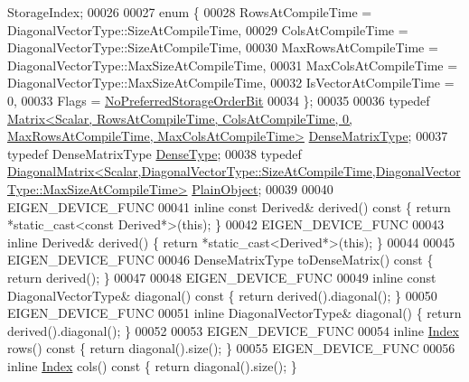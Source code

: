 \begin{DoxyCode}
      StorageIndex;
00026 
00027     \textcolor{keyword}{enum} \{
00028       RowsAtCompileTime = DiagonalVectorType::SizeAtCompileTime,
00029       ColsAtCompileTime = DiagonalVectorType::SizeAtCompileTime,
00030       MaxRowsAtCompileTime = DiagonalVectorType::MaxSizeAtCompileTime,
00031       MaxColsAtCompileTime = DiagonalVectorType::MaxSizeAtCompileTime,
00032       IsVectorAtCompileTime = 0,
00033       Flags = \hyperlink{group__flags_ga3c186ad80ddcf5e2ed3d7ee31cca1860}{NoPreferredStorageOrderBit}
00034     \};
00035 
00036     \textcolor{keyword}{typedef} 
      \hyperlink{group___core___module_class_eigen_1_1_matrix}{Matrix<Scalar, RowsAtCompileTime, ColsAtCompileTime, 0, MaxRowsAtCompileTime, MaxColsAtCompileTime>}
       \hyperlink{group___core___module_class_eigen_1_1_matrix}{DenseMatrixType};
00037     \textcolor{keyword}{typedef} DenseMatrixType \hyperlink{group___core___module_class_eigen_1_1_matrix}{DenseType};
00038     \textcolor{keyword}{typedef} 
      \hyperlink{group___core___module_class_eigen_1_1_diagonal_matrix}{DiagonalMatrix<Scalar,DiagonalVectorType::SizeAtCompileTime,DiagonalVectorType::MaxSizeAtCompileTime>}
       \hyperlink{group___core___module_class_eigen_1_1_diagonal_matrix}{PlainObject};
00039 
00040     EIGEN\_DEVICE\_FUNC
00041     \textcolor{keyword}{inline} \textcolor{keyword}{const} Derived& derived()\textcolor{keyword}{ const }\{ \textcolor{keywordflow}{return} *\textcolor{keyword}{static\_cast<}\textcolor{keyword}{const }Derived*\textcolor{keyword}{>}(\textcolor{keyword}{this}); \}
00042     EIGEN\_DEVICE\_FUNC
00043     \textcolor{keyword}{inline} Derived& derived() \{ \textcolor{keywordflow}{return} *\textcolor{keyword}{static\_cast<}Derived*\textcolor{keyword}{>}(\textcolor{keyword}{this}); \}
00044 
00045     EIGEN\_DEVICE\_FUNC
00046     DenseMatrixType toDenseMatrix()\textcolor{keyword}{ const }\{ \textcolor{keywordflow}{return} derived(); \}
00047     
00048     EIGEN\_DEVICE\_FUNC
00049     \textcolor{keyword}{inline} \textcolor{keyword}{const} DiagonalVectorType& diagonal()\textcolor{keyword}{ const }\{ \textcolor{keywordflow}{return} derived().diagonal(); \}
00050     EIGEN\_DEVICE\_FUNC
00051     \textcolor{keyword}{inline} DiagonalVectorType& diagonal() \{ \textcolor{keywordflow}{return} derived().diagonal(); \}
00052 
00053     EIGEN\_DEVICE\_FUNC
00054     \textcolor{keyword}{inline} \hyperlink{group___core___module_a554f30542cc2316add4b1ea0a492ff02}{Index} rows()\textcolor{keyword}{ const }\{ \textcolor{keywordflow}{return} diagonal().size(); \}
00055     EIGEN\_DEVICE\_FUNC
00056     \textcolor{keyword}{inline} \hyperlink{group___core___module_a554f30542cc2316add4b1ea0a492ff02}{Index} cols()\textcolor{keyword}{ const }\{ \textcolor{keywordflow}{return} diagonal().size(); \}

\end{DoxyCode}
